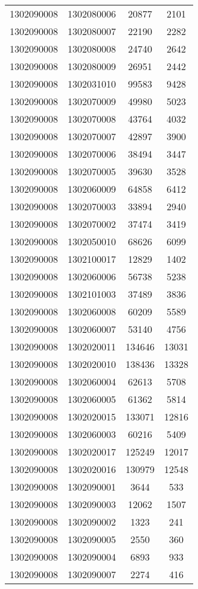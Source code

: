 \begin{longtable}{llcc}
1302090008 & 1302080006 & 20877 & 2101\\
1302090008 & 1302080007 & 22190 & 2282\\
1302090008 & 1302080008 & 24740 & 2642\\
1302090008 & 1302080009 & 26951 & 2442\\
1302090008 & 1302031010 & 99583 & 9428\\
1302090008 & 1302070009 & 49980 & 5023\\
1302090008 & 1302070008 & 43764 & 4032\\
1302090008 & 1302070007 & 42897 & 3900\\
1302090008 & 1302070006 & 38494 & 3447\\
1302090008 & 1302070005 & 39630 & 3528\\
1302090008 & 1302060009 & 64858 & 6412\\
1302090008 & 1302070003 & 33894 & 2940\\
1302090008 & 1302070002 & 37474 & 3419\\
1302090008 & 1302050010 & 68626 & 6099\\
1302090008 & 1302100017 & 12829 & 1402\\
1302090008 & 1302060006 & 56738 & 5238\\
1302090008 & 1302101003 & 37489 & 3836\\
1302090008 & 1302060008 & 60209 & 5589\\
1302090008 & 1302060007 & 53140 & 4756\\
1302090008 & 1302020011 & 134646 & 13031\\
1302090008 & 1302020010 & 138436 & 13328\\
1302090008 & 1302060004 & 62613 & 5708\\
1302090008 & 1302060005 & 61362 & 5814\\
1302090008 & 1302020015 & 133071 & 12816\\
1302090008 & 1302060003 & 60216 & 5409\\
1302090008 & 1302020017 & 125249 & 12017\\
1302090008 & 1302020016 & 130979 & 12548\\
1302090008 & 1302090001 & 3644 & 533\\
1302090008 & 1302090003 & 12062 & 1507\\
1302090008 & 1302090002 & 1323 & 241\\
1302090008 & 1302090005 & 2550 & 360\\
1302090008 & 1302090004 & 6893 & 933\\
1302090008 & 1302090007 & 2274 & 416\\

\end{longtable}
